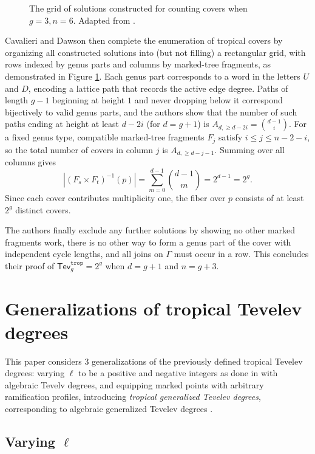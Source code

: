 \documentclass[11pt,reqno]{amsart}
\newcommand{\inputTikZ}[2]{%
     \resizebox{#1}{!}{}}
\theoremstyle{definition}
\newcommand\trop{{\mathtt{trop}}}
\newcommand{\Tev}{{\mathsf{Tev}}}
\begin{document}
\begin{figure}[tb]
    \centering
   \inputTikZ{\textwidth}{Figures/genus3grid}
    \caption{The grid of solutions constructed for counting covers when $g=3, n=6$. Adapted from \cite{troptev}.}
    \label{fig:g=3grid}
\end{figure}

Cavalieri and Dawson then complete the enumeration of tropical covers by organizing all constructed solutions into (but not filling) a rectangular grid, with rows indexed by genus parts and columns by marked-tree fragments, as demonstrated in Figure \ref{fig:g=3grid}. Each genus part corresponds to a word in the letters $U$ and $D$, encoding a lattice path that records the active edge degree. Paths of length $g-1$ beginning at height $1$ and never dropping below it correspond bijectively to valid genus parts, and the authors show that the number of such paths ending at height at least $d - 2i$ (for $d = g + 1$) is $A_{d,\ge d - 2i} = \binom{d - 1}{i}$. For a fixed genus type, compatible marked-tree fragments $F_j$ satisfy $i \le j \le n - 2 - i$, so the total number of covers in column $j$ is $A_{d,\ge d - j - 1}$. Summing over all columns gives
\[
|(F_s \times F_t)^{-1}(p)| = \sum_{m=0}^{d-1} \binom{d-1}{m} = 2^{d-1} = 2^{g}.
\]
Since each cover contributes multiplicity one, the fiber over $p$ consists of at least $2^{g}$ distinct covers.

 The authors finally exclude any further solutions by showing no other marked fragments work, there is no other way to form a genus part of the cover with independent cycle lengths, and all joins on $\Gamma$ must occur in a row. This concludes their proof of $\Tev^\trop_g = 2^g$ when $d=g+1$ and $n=g+3$.


\section{Generalizations of tropical Tevelev degrees}
This paper considers $3$ generalizations of the previously defined tropical Tevelev degrees: varying $\ell$ to be a positive and negative integers as done in \cite{CPS:Tevdeg} with algebraic Tevelv degrees, and equipping marked points with arbitrary ramification profiles, introducing \textit{tropical generalized Tevelev degrees}, corresponding to algebraic generalized Tevelev degrees \cite{GenTev}.

\subsection{Varying $\ell$}
\end{document}
